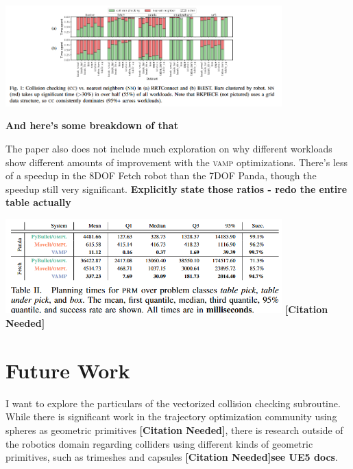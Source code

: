 \documentclass{article}
\newcommand{\todo}[1]{\textbf{\color{red}#1}}
\newcommand{\citationneeded}{\textbf{\color{blue}[Citation Needed]}}
\begin{document}
\includegraphics[width=0.8\textwidth]{./assets/cc_nn.png}

\todo{And here's some breakdown of that}

The paper also does not include much exploration on why different workloads show different amounts of improvement with the \textsc{vamp} optimizations. There’s less of a speedup in the 8DOF Fetch robot than the 7DOF Panda, though the speedup still very significant. \todo{Explicitly state those ratios - redo the entire table actually}

\includegraphics[width=0.8\textwidth]{./assets/78_table.png} \citationneeded

\section{Future Work}

I want to explore the particulars of the vectorized collision checking subroutine. While there is significant work in the trajectory optimization community using spheres as geometric primitives \citationneeded, there is research outside of the robotics domain regarding colliders using different kinds of geometric primitives, such as trimeshes and capsules \citationneeded \todo{see UE5 docs}. 
\end{document}
